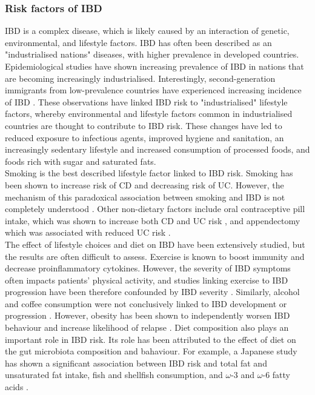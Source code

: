 \subsubsection{Risk factors of IBD}
IBD is a complex disease, which is likely caused by an interaction of genetic, environmental, and lifestyle factors. IBD has often been described as an "industrialised nations" diseases, with higher prevalence in developed countries. Epidemiological studies have shown increasing prevalence of IBD in nations that are becoming increasingly industrialised. Interestingly, second-generation immigrants from low-prevalence countries have experienced increasing incidence of IBD \cite{Bernstein2008-ln}. These observations have linked IBD risk to "industrialised" lifestyle factors, whereby environmental and lifestyle factors common in industrialised countries are thought to contribute to IBD risk. These changes have led to reduced exposure to infectious agents, improved hygiene and sanitation, an increasingly sedentary lifestyle and increased consumption of processed foods, and foods rich with sugar and saturated fats.\\

Smoking is the best described lifestyle factor linked to IBD risk. Smoking has been shown to increase risk of CD and decreasing risk of UC. However, the mechanism of this paradoxical association between smoking and IBD is not completely understood \cite{Richardson2003-pd}.  Other non-dietary factors include oral contraceptive pill intake, which was shown to increase both CD and UC risk \cite{Cornish2008-rn}, and appendectomy which was associated with reduced UC risk \cite{Koutroubakis2000-qt}.\\

The effect of lifestyle choices and diet on IBD have been extensively studied, but the results are often difficult to assess. Exercise is known to boost immunity and decrease proinflammatory cytokines. However, the severity of IBD symptoms often impacts patients' physical activity, and studies linking exercise to IBD progression have been therefore confounded by IBD severity \cite{Rozich2020-ui}. Similarly, alcohol and coffee consumption were not conclusively linked to IBD development or progression \cite{Yang2019-gt}. However, obesity has been shown to independently worsen IBD behaviour and increase likelihood of relapse \cite{Jain2019-oy}. Diet composition also plays an important role in IBD risk. Its role has been attributed to the effect of diet on the gut microbiota composition and bahaviour. For example, a Japanese study has shown a significant association between IBD risk and total fat and unsaturated fat intake, fish and shellfish consumption, and $\omega$-3 and $\omega$-6 fatty acids \cite{Reif1997-li}.\\



